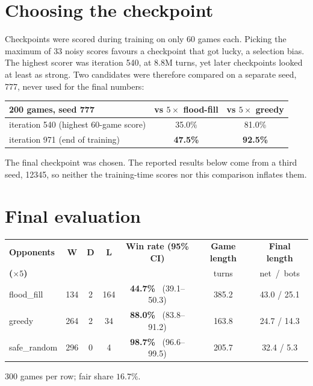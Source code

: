 \section{Choosing the checkpoint}

\begin{warnbox}
Checkpoints were scored during training on only 60 games each. Picking the maximum of 33
noisy scores favours a checkpoint that got lucky, a selection bias. The highest scorer
was iteration 540, at 8.8M turns, yet later checkpoints looked at least as strong. Two
candidates were therefore compared on a separate seed, 777, never used for the final
numbers:
\begin{center}
\begin{tabular}{@{}lcc@{}}
\toprule
\textbf{200 games, seed 777} & \textbf{vs $5\times$ flood-fill} & \textbf{vs $5\times$ greedy}\\
\midrule
iteration 540 (highest 60-game score) & 35.0\% & 81.0\%\\
iteration 971 (end of training) & \textbf{47.5\%} & \textbf{92.5\%}\\
\bottomrule
\end{tabular}
\end{center}
The final checkpoint was chosen. The reported results below come from a third seed,
12345, so neither the training-time scores nor this comparison inflates them.
\end{warnbox}

\section{Final evaluation}

\begin{center}
\begin{tabular}{@{}lcccccc@{}}
\toprule
\textbf{Opponents} & \textbf{W} & \textbf{D} & \textbf{L} & \textbf{Win rate (95\% CI)} &
  \textbf{Game length} & \textbf{Final length}\\
\textbf{($\times5$)} & & & & & \footnotesize turns & \footnotesize net\ /\ bots\\
\midrule
flood\_fill & 134 & 2 & 164 & \textbf{44.7\%} \ (39.1--50.3) & 385.2 & 43.0 / 25.1\\
greedy & 264 & 2 & 34 & \textbf{88.0\%} \ (83.8--91.2) & 163.8 & 24.7 / 14.3\\
safe\_random & 296 & 0 & 4 & \textbf{98.7\%} \ (96.6--99.5) & 205.7 & 32.4 / \hphantom{1}5.3\\
\bottomrule
\end{tabular}
\end{center}
\begin{center}
\footnotesize\color{cmudark} 300 games per row; fair share $16.7\%$.
\end{center}

